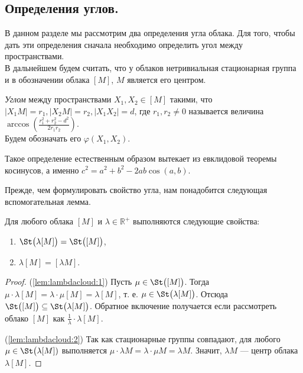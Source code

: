\subsection{Определения углов.}
В данном разделе мы рассмотрим два определения угла облака. Для того, чтобы
дать эти определения сначала необходимо определить угол между пространствами.
\\
В дальнейшем будем считать, что у облаков нетривиальная стационарная группа и в
обозначении облака $ [M] $, $ M $ является его центром.
\begin{definition}
  \emph{Углом} между пространствами $ X_1, X_2 \in [M] $ такими, что $ |X_1
  M| = r_1, | X_2 M | =r_2, |X_1 X_2| = d$, где $ r_1,
  r_2 \neq 0 $ называется величина $ \arccos \left(\frac{r_1^2 +
  r_{2}^2 - d^2}{2r_1r_2} \right)$.\\ Будем обозначать его $
  \varphi(X_1, X_2) $.
\end{definition}
\begin{remark}
  Такое определение естественным образом вытекает из евклидовой теоремы
  косинусов, а именно $ c^{2} = a^2 + b^2 - 2ab\cos (a,b) $.
\end{remark}
Прежде, чем формулировать свойство угла, нам понадобится следующая
вспомогательная лемма.
\begin{lemma}
  \label{lem:lambdacloud} Для любого облака \( [M] \) и \( \lambda
  \in\mathbb{R}^+ \) выполняются следующие свойства{\textup{:}}
  \begin{enumerate}
    \item \( \St\big(\lambda [M]\big) = \St\big([M]\big)\),
      \label{lem:lambdacloud:1}
    \item \( \lambda [M] = [\lambda M] \).\label{lem:lambdacloud:2}
  \end{enumerate}
\end{lemma}
\begin{proof}
  (\ref{lem:lambdacloud:1}) Пусть \( \mu \in \St\big([M]\big) \). Тогда \( \mu
  \cdot \lambda [M] = \lambda \cdot \mu [M]= \lambda [M] \), т. е. \( \mu \in
  \St\big(\lambda [M]\big) \). Отсюда \( \St\big([M]\big) \subseteq
  \St\big(\lambda [M]\big) \). Обратное включение получается если рассмотреть
  облако \( [M] \) как \(\frac{1}{\lambda}\cdot \lambda [M] \).

  (\ref{lem:lambdacloud:2}) Так как стационарные группы совпадают, для любого
  \( \mu \in  \St\big(\lambda [M])\) выполняется \( \mu \cdot \lambda M =
  \lambda \cdot \mu M = \lambda M \). Значит, \( \lambda M \) --- центр
  облака \( \lambda [M] \).
\end{proof}

